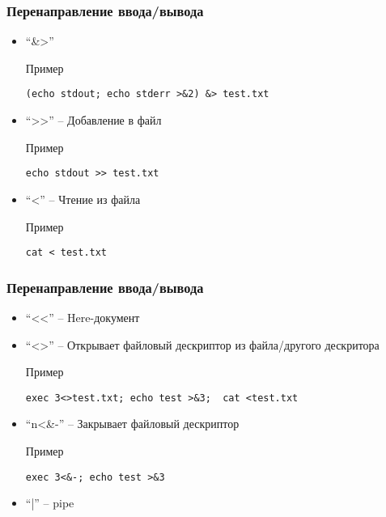 \begin{frame}[fragile]
	\frametitle{Перенаправление ввода/вывода}

	\begin{itemize}

		\item ``\&>''
			\begin{block}{Пример}
				\begin{lstlisting}
(echo stdout; echo stderr >&2) &> test.txt
				\end{lstlisting}
			\end{block}
		
		\item ``>{}>'' -- Добавление в файл
			\begin{block}{Пример}
				\begin{lstlisting}
echo stdout >> test.txt
				\end{lstlisting}
			\end{block}

		\item ``<'' -- Чтение из файла
			\begin{block}{Пример}
				\begin{lstlisting}
cat < test.txt
				\end{lstlisting}
			\end{block}
	\end{itemize}

\end{frame}


\begin{frame}[fragile]
	\frametitle{Перенаправление ввода/вывода}

	\begin{itemize}

		\item ``<<'' -- Here-документ

		\item ``<>'' -- Открывает файловый дескриптор из файла/другого дескритора
			\begin{block}{Пример}
				\begin{lstlisting}
exec 3<>test.txt; echo test >&3;  cat <test.txt
				\end{lstlisting}
			\end{block}
			
		\item ``n<\&-'' -- Закрывает файловый дескриптор
			\begin{block}{Пример}
				\begin{lstlisting}
exec 3<&-; echo test >&3
				\end{lstlisting}
			\end{block}
			
		\item ``|'' -- pipe
	\end{itemize}

\end{frame}


